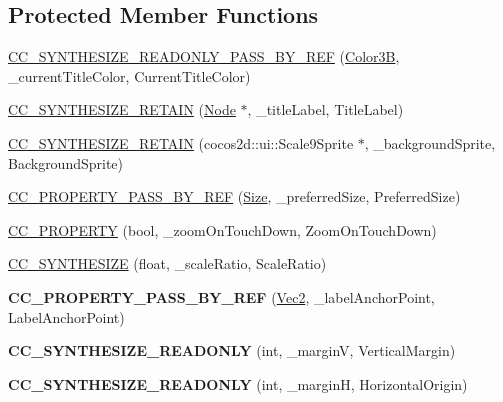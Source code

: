 \subsection*{Protected Member Functions}
\begin{DoxyCompactItemize}
\item 
\hyperlink{classControlButton_a66409124fe6e7f1ff798b491c95e808b}{C\+C\+\_\+\+S\+Y\+N\+T\+H\+E\+S\+I\+Z\+E\+\_\+\+R\+E\+A\+D\+O\+N\+L\+Y\+\_\+\+P\+A\+S\+S\+\_\+\+B\+Y\+\_\+\+R\+EF} (\hyperlink{structColor3B}{Color3B}, \+\_\+current\+Title\+Color, Current\+Title\+Color)
\item 
\hyperlink{classControlButton_a8e36d603656c2abf3a5a8c8ba42fcf91}{C\+C\+\_\+\+S\+Y\+N\+T\+H\+E\+S\+I\+Z\+E\+\_\+\+R\+E\+T\+A\+IN} (\hyperlink{classNode}{Node} $\ast$, \+\_\+title\+Label, Title\+Label)
\item 
\hyperlink{classControlButton_a801f4bdf785faa8e3663231a6959bd0d}{C\+C\+\_\+\+S\+Y\+N\+T\+H\+E\+S\+I\+Z\+E\+\_\+\+R\+E\+T\+A\+IN} (cocos2d\+::ui\+::\+Scale9\+Sprite $\ast$, \+\_\+background\+Sprite, Background\+Sprite)
\item 
\hyperlink{classControlButton_a29fa469305c5e53491ab121cdb12087f}{C\+C\+\_\+\+P\+R\+O\+P\+E\+R\+T\+Y\+\_\+\+P\+A\+S\+S\+\_\+\+B\+Y\+\_\+\+R\+EF} (\hyperlink{classSize}{Size}, \+\_\+preferred\+Size, Preferred\+Size)
\item 
\hyperlink{classControlButton_a6199f1b2dceb5ef3da11bae8ef709311}{C\+C\+\_\+\+P\+R\+O\+P\+E\+R\+TY} (bool, \+\_\+zoom\+On\+Touch\+Down, Zoom\+On\+Touch\+Down)
\item 
\hyperlink{classControlButton_af94ba5949cd9064c7cf8952db760583b}{C\+C\+\_\+\+S\+Y\+N\+T\+H\+E\+S\+I\+ZE} (float, \+\_\+scale\+Ratio, Scale\+Ratio)
\item 
\mbox{\label{classControlButton_a51ba2adc77bd00d14cc37cb9aa180b7a}} 
{\bfseries C\+C\+\_\+\+P\+R\+O\+P\+E\+R\+T\+Y\+\_\+\+P\+A\+S\+S\+\_\+\+B\+Y\+\_\+\+R\+EF} (\hyperlink{classVec2}{Vec2}, \+\_\+label\+Anchor\+Point, Label\+Anchor\+Point)
\item 
\mbox{\label{classControlButton_a2fea81b39e14fa00f7aa8da5ecb98314}} 
{\bfseries C\+C\+\_\+\+S\+Y\+N\+T\+H\+E\+S\+I\+Z\+E\+\_\+\+R\+E\+A\+D\+O\+N\+LY} (int, \+\_\+marginV, Vertical\+Margin)
\item 
\mbox{\label{classControlButton_ac82c25487ff096dbce3b2184017e771c}} 
{\bfseries C\+C\+\_\+\+S\+Y\+N\+T\+H\+E\+S\+I\+Z\+E\+\_\+\+R\+E\+A\+D\+O\+N\+LY} (int, \+\_\+marginH, Horizontal\+Origin)

\end{DoxyCompactItemize}
